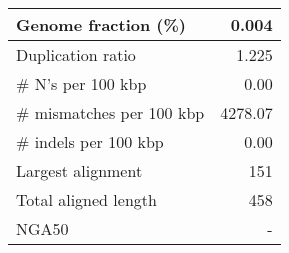 \documentclass[12pt,a4paper]{article}
\begin{document}
\begin{table}[ht]
\begin{center}
\begin{tabular}{|l*{1}{|r}|}
Genome fraction (\%) & 0.004 \\ \hline
Duplication ratio & 1.225 \\ \hline
\# N's per 100 kbp & 0.00 \\ \hline
\# mismatches per 100 kbp & 4278.07 \\ \hline
\# indels per 100 kbp & 0.00 \\ \hline
Largest alignment & 151 \\ \hline
Total aligned length & 458 \\ \hline
NGA50 & - \\ \hline
\end{tabular}
\end{center}
\end{table}
\end{document}
